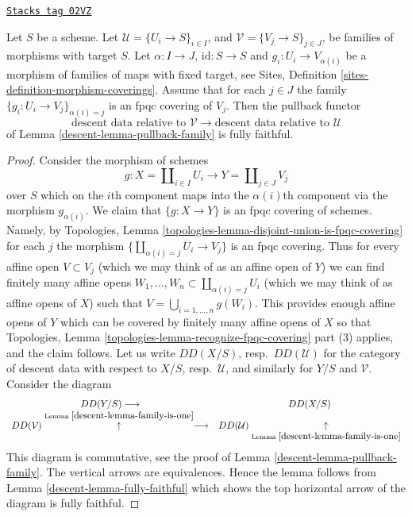 \begin{lemma}
\label{descent-lemma-fpqc-refinement-coverings-fully-faithful}
\href{https://stacks.math.columbia.edu/tag/02VZ}{\texttt{Stacks tag 02VZ}}

Let $S$ be a scheme.
Let $\mathcal{U} = \{U_i \to S\}_{i \in I}$, and
$\mathcal{V} = \{V_j \to S\}_{j \in J}$,
be families of morphisms with target $S$.
Let $\alpha : I \to J$, $\text{id} : S \to S$ and
$g_i : U_i \to V_{\alpha(i)}$ be a morphism of families
of maps with fixed target, see
Sites, Definition \ref{sites-definition-morphism-coverings}.
Assume that for each $j \in J$ the family
$\{g_i : U_i \to V_j\}_{\alpha(i) = j}$ is an fpqc
covering of $V_j$. Then the pullback functor
$$
\text{descent data relative to }
\mathcal{V}
\longrightarrow
\text{descent data relative to }
\mathcal{U}
$$
of Lemma \ref{descent-lemma-pullback-family} is fully faithful.
\end{lemma}

\begin{proof}

Consider the morphism of schemes
$$
g :
X = \coprod\nolimits_{i \in I} U_i
\longrightarrow
Y = \coprod\nolimits_{j \in J} V_j
$$
over $S$ which on the $i$th component maps into the $\alpha(i)$th component
via the morphism $g_{\alpha(i)}$. We claim that $\{g : X \to Y\}$
is an fpqc covering of schemes. Namely, by
Topologies, Lemma \ref{topologies-lemma-disjoint-union-is-fpqc-covering}
for each $j$ the morphism $\{\coprod_{\alpha(i) = j} U_i \to V_j\}$ is an
fpqc covering. Thus for every affine open $V \subset V_j$
(which we may think of as an affine open of $Y$)
we can find finitely many affine opens
$W_1, \ldots, W_n \subset \coprod_{\alpha(i) = j} U_i$
(which we may think of as affine opens of $X$)
such that $V = \bigcup_{i = 1, \ldots, n} g(W_i)$.
This provides enough affine opens of $Y$ which can be covered by finitely
many affine opens of $X$ so that
Topologies, Lemma \ref{topologies-lemma-recognize-fpqc-covering} part (3)
applies, and the claim follows. Let us write $DD(X/S)$,
resp.\ $DD(\mathcal{U})$ for the category of descent data with respect
to $X/S$, resp.\ $\mathcal{U}$, and similarly for $Y/S$ and $\mathcal{V}$.
Consider the diagram
$$
\begin{array}{cc}DD(Y/S) \longrightarrow & DD(X/S) \\ DD(\mathcal{V}) \overset{\text{Lemma }\ref{descent-lemma-family-is-one}}{\uparrow}\longrightarrow & DD(\mathcal{U}) \underset{\text{Lemma }\ref{descent-lemma-family-is-one}}{\uparrow}\end{array}
$$
This diagram is commutative, see the proof of
Lemma \ref{descent-lemma-pullback-family}.
The vertical arrows are equivalences. Hence the lemma follows from
Lemma \ref{descent-lemma-fully-faithful} which shows the top horizontal arrow
of the diagram is fully faithful.
\end{proof}

